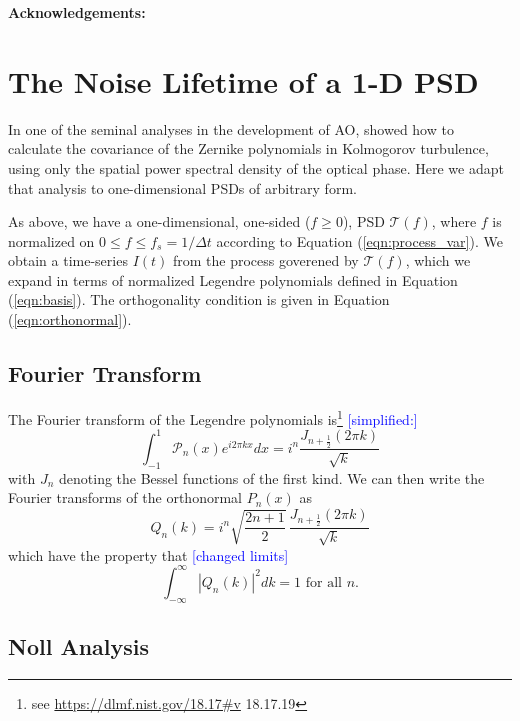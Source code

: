 \documentclass[10pt,preprint]{aastex631}
\newcommand{\jrmadd}[1]{\textcolor{blue}{#1}}
\begin{document}
\textbf{Acknowledgements:}

\clearpage
\appendix
\section{The Noise Lifetime of a 1-D PSD}
\label{app:tau_psd}

In one of the seminal analyses in the development of AO, \citet{1976JOSA...66..207N} showed how to calculate the covariance of the Zernike polynomials in Kolmogorov turbulence, using only the spatial power spectral density of the optical phase. Here we adapt that analysis to one-dimensional PSDs of arbitrary form.  

As above, we have a one-dimensional, one-sided ($f \ge 0$),  PSD $\mathcal{T}(f)$, where $f$ is normalized on $0 \leq f \leq f_s = 1/\Delta t$ according to Equation (\ref{eqn:process_var}).  We obtain a time-series $I(t)$ from the process goverened by $\mathcal{T}(f)$, which we expand in terms of normalized Legendre polynomials defined in Equation (\ref{eqn:basis}).  The orthogonality condition is given in Equation (\ref{eqn:orthonormal}).
 
\subsection{Fourier Transform}

The Fourier transform of the Legendre polynomials is\footnote{see \url{https://dlmf.nist.gov/18.17\#v} 18.17.19} \jrmadd{[simplified:]}
\begin{equation}
\int_{-1}^{1} \mathscr{P}_n(x) e^{i2\pi k x} dx  =  i^n \frac{J_{n+\frac{1}{2}}(2\pi k)}{\sqrt{k}}
\end{equation}
with $J_n$ denoting the Bessel functions of the first kind.  We can then write the Fourier transforms of the orthonormal $P_n(x)$ as 
\begin{equation}
Q_n(k) = i^n \sqrt{\frac{2n+1}{2}}\, \frac{J_{n+\frac{1}{2}}(2\pi k)}{\sqrt{k}}
\end{equation}
which have the property that \jrmadd{[changed limits]}
\begin{equation}
\int_{-\infty}^\infty \left| Q_n(k) \right|^2 dk = 1 \mbox{ for all }n.
\end{equation}

\subsection{Noll Analysis}
\end{document}
